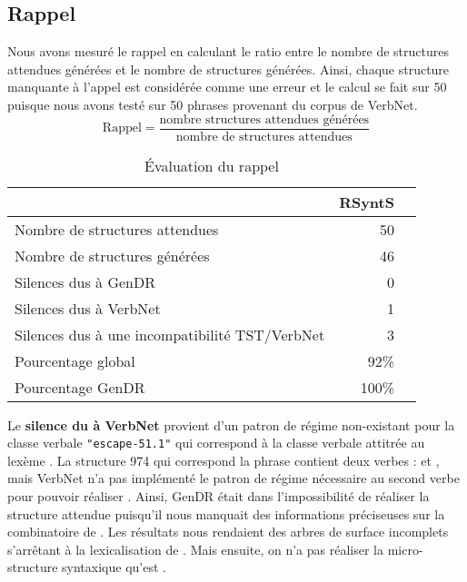 \subsection{Rappel}
Nous avons mesuré le rappel en calculant le ratio entre le nombre de structures attendues générées et le nombre de structures générées. Ainsi, chaque structure manquante à l'appel est considérée comme une erreur et le calcul se fait sur 50 puisque nous avons testé sur 50 phrases provenant du corpus de VerbNet.
\[\text{Rappel} = \frac{\text{nombre structures attendues générées}}{\text{nombre de structures attendues}}\]

\begin{table}
\caption{Évaluation du rappel}
\begin{tabular}{lrr}
 \toprule
   & RSyntS\\
 \midrule
 Nombre de structures attendues   & 50\\
 Nombre de structures générées &  46\\
 Silences dus à GenDR & 0\\
 Silences dus à VerbNet    & 1\\
 Silences dus à une incompatibilité TST/VerbNet & 3\\
 \midrule
Pourcentage global & 92\% \\
Pourcentage GenDR & 100\% \\
\bottomrule
\end{tabular}
\end{table}

Le \textbf{silence du à VerbNet} provient d'un patron de régime non-existant pour la classe verbale \texttt{"escape-51.1"} qui correspond à la classe verbale attitrée au lexème . La structure 974 qui correspond la phrase  contient deux verbes :  et , mais VerbNet n'a pas implémenté le patron de régime nécessaire au second verbe pour pouvoir réaliser . Ainsi, GenDR était dans l'impossibilité de réaliser la structure attendue puisqu'il nous manquait des informations préciseuses sur la combinatoire de . Les résultats nous rendaient des arbres de surface incomplets s'arrêtant à la lexicalisation de . Mais ensuite, on n'a pas réaliser la micro-structure syntaxique qu'est .

